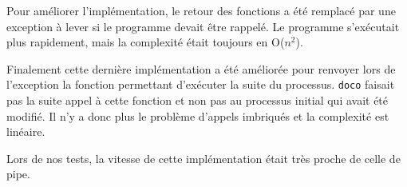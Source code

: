 \documentclass[a4paper]{article}
\begin{document}
Pour améliorer l'implémentation, le retour des fonctions a été remplacé par une exception à lever si le programme devait être rappelé. Le programme s'exécutait plus rapidement, mais la complexité était toujours en O($n^2$).

Finalement cette dernière implémentation a été améliorée pour renvoyer lors de l'exception la fonction permettant d'exécuter la suite du processus. \verb!doco! faisait pas la suite appel à cette fonction et non pas au processus initial qui avait été modifié. Il n'y a donc plus le problème d'appels imbriqués et la complexité est linéaire.

Lors de nos tests, la vitesse de cette implémentation était très proche de celle de pipe.
\end{document}
